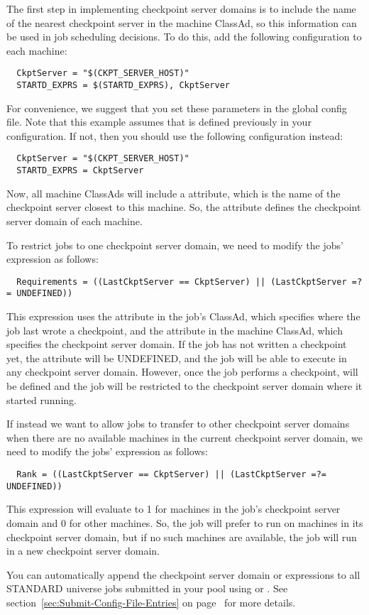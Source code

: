 The first step in implementing checkpoint server domains is to include
the name of the nearest checkpoint server in the machine
ClassAd, so this information can be used in job scheduling decisions.
To do this, add the following configuration to each machine:
\begin{verbatim}
  CkptServer = "$(CKPT_SERVER_HOST)"
  STARTD_EXPRS = $(STARTD_EXPRS), CkptServer
\end{verbatim}
For convenience, we suggest that you set these parameters in the
global config file.  Note that this example assumes that
 is defined previously in your configuration.  If
not, then you should use the following configuration instead:
\begin{verbatim}
  CkptServer = "$(CKPT_SERVER_HOST)"
  STARTD_EXPRS = CkptServer
\end{verbatim}
Now, all machine ClassAds will include a 
attribute, which is the name of the checkpoint server closest to this
machine.  So, the  attribute defines the checkpoint
server domain of each machine.

To restrict jobs to one checkpoint server domain, we need to modify
the jobs'  expression as follows:
\begin{verbatim}
  Requirements = ((LastCkptServer == CkptServer) || (LastCkptServer =?= UNDEFINED))
\end{verbatim}
This  expression uses the 
attribute in the job's ClassAd, which specifies where the job last
wrote a checkpoint, and the  attribute in the
machine ClassAd, which specifies the checkpoint server domain.  If the
job has not written a checkpoint yet, the 
attribute will be UNDEFINED, and the job will be able to execute in
any checkpoint server domain.  However, once the job performs a
checkpoint,
 will be defined and the job will be restricted to the
checkpoint server domain where it started running.

If instead we want to allow jobs to transfer to other checkpoint
server domains when there are no available machines in the current
checkpoint server domain, we need to modify the jobs'  expression
as follows:
\begin{verbatim}
  Rank = ((LastCkptServer == CkptServer) || (LastCkptServer =?= UNDEFINED))
\end{verbatim}
This  expression will evaluate to 1 for machines in the
job's checkpoint server domain and 0 for other machines.  So, the job
will prefer to run on machines in its checkpoint server domain, but if
no such machines are available, the job will run in a new checkpoint
server domain.

You can automatically append the checkpoint server domain
 or  expressions to all STANDARD
universe jobs submitted in your pool using
 or .
See section~\ref{sec:Submit-Config-File-Entries} on
page~\pageref{sec:Submit-Config-File-Entries} for more details.
